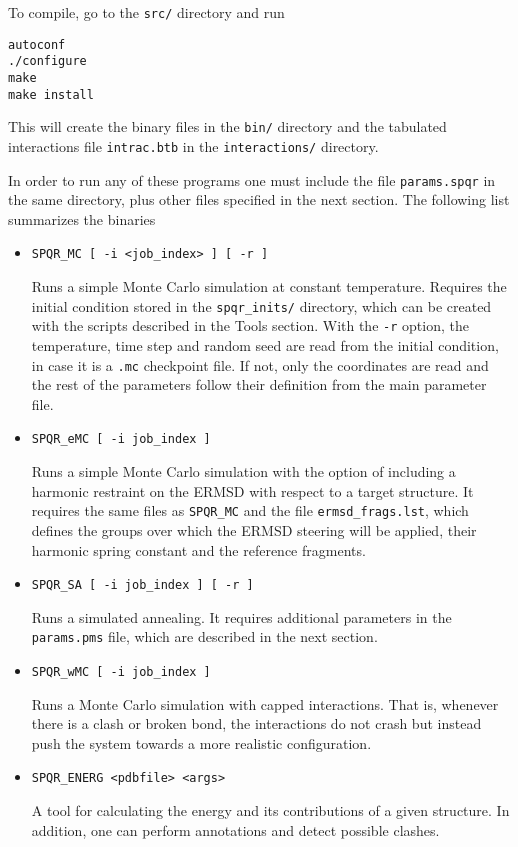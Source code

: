 \documentclass{article}
\begin{document}
To compile, go to the \texttt{src/} directory and run
\begin{verbatim}
autoconf
./configure
make
make install
\end{verbatim}
This will create the binary files in the \texttt{bin/} directory and the tabulated interactions file \texttt{intrac.btb}  in the \texttt{interactions/} directory.

In order to run any of these programs one must include the file \texttt{params.spqr} in the same directory, plus other files specified in the next section. The following list summarizes the binaries
\begin{itemize}
\item \texttt{SPQR\_MC [ -i <job\_index> ] [ -r ]}

  Runs a simple Monte Carlo simulation at constant temperature. Requires the initial condition stored in the \texttt{spqr\_inits/} directory, which can be created with the scripts described in the Tools section. With the \texttt{-r} option, the temperature, time step and random seed are read from the initial condition, in case it is a \texttt{.mc} checkpoint file. If not, only the coordinates are read and the rest of the parameters follow their definition from the main parameter file.

\item \texttt{SPQR\_eMC [ -i job\_index ]}

  Runs a simple Monte Carlo simulation with the option of including a harmonic restraint on the ERMSD with respect to a target structure. It requires the same files as \texttt{SPQR\_MC} and the file \texttt{ermsd\_frags.lst}, which defines the groups over which the ERMSD steering will be applied, their harmonic spring constant and the reference fragments.

\item \texttt{SPQR\_SA [ -i job\_index ] [ -r ]}

  Runs a simulated annealing. It requires additional parameters in the \texttt{params.pms} file, which are described in the next section.

 \item \texttt{SPQR\_wMC [ -i job\_index ]}
 
Runs a Monte Carlo simulation with capped interactions. That is, whenever there is a clash or broken bond, the interactions do not crash but instead push the system towards a more realistic configuration.

\item  \texttt{SPQR\_ENERG <pdbfile> <args>}

 A tool for calculating the energy and its contributions of a given structure. In addition, one can perform annotations and detect possible clashes.
 
\end{itemize}
\end{document}

